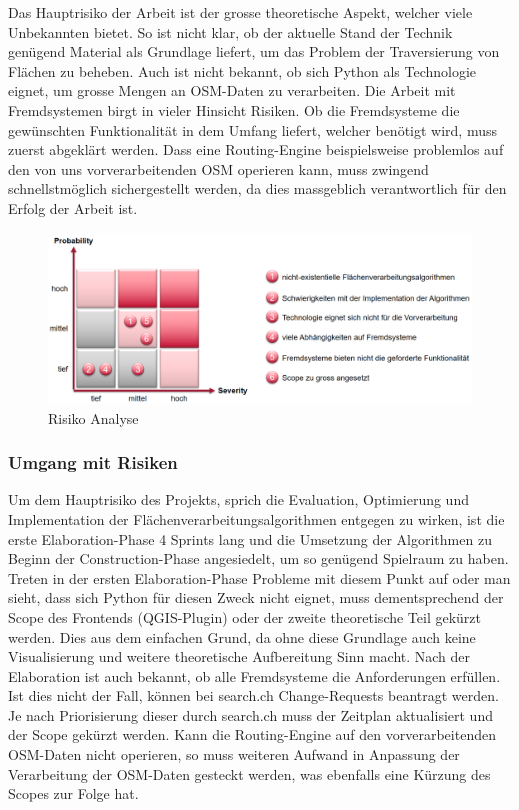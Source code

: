 Das Hauptrisiko der Arbeit ist der grosse theoretische Aspekt, welcher viele Unbekannten bietet. So ist nicht klar, ob der aktuelle Stand der Technik genügend Material als Grundlage liefert, um das Problem der Traversierung von Flächen zu beheben. Auch ist nicht bekannt, ob sich Python als Technologie eignet, um grosse Mengen an \ac{OSM}-Daten zu verarbeiten. Die Arbeit mit Fremdsystemen birgt in vieler Hinsicht Risiken. Ob die Fremdsysteme die gewünschten Funktionalität in dem Umfang liefert, welcher benötigt wird, muss zuerst abgeklärt werden. Dass eine \gls{Routing-Engine} beispielsweise problemlos auf den von uns vorverarbeitenden \ac{OSM} operieren kann, muss zwingend schnellstmöglich sichergestellt werden, da dies massgeblich verantwortlich für den Erfolg der Arbeit ist.

\begin{figure}[ht]
    \centering
    \includegraphics[width=1\linewidth]{projectdoc/img/risk_analysis}
    \caption[Risiko Analyse]{Risiko Analyse}
    \label{fig:risk_analysis}
\end{figure}

\subsubsection{Umgang mit Risiken}
\label{Risiken:Umang mit Risiken}
Um dem Hauptrisiko des Projekts, sprich die Evaluation, Optimierung und Implementation der Flächenverarbeitungsalgorithmen entgegen zu wirken, ist die erste Elaboration-Phase 4 Sprints lang und die Umsetzung der Algorithmen zu Beginn der Construction-Phase angesiedelt, um so genügend Spielraum zu haben. Treten in der ersten Elaboration-Phase Probleme mit diesem Punkt auf oder man sieht, dass sich Python für diesen Zweck nicht eignet, muss dementsprechend der Scope des Frontends (QGIS-Plugin) oder der zweite theoretische Teil gekürzt werden. Dies aus dem einfachen Grund, da ohne diese Grundlage auch keine Visualisierung und weitere theoretische Aufbereitung Sinn macht. Nach der Elaboration ist auch bekannt, ob alle Fremdsysteme die Anforderungen erfüllen. Ist dies nicht der Fall, können bei search.ch \cite{search_ch_route_api} Change-Requests beantragt werden. Je nach Priorisierung dieser durch search.ch muss der Zeitplan aktualisiert und der Scope gekürzt werden. Kann die Routing-Engine auf den vorverarbeitenden \ac{OSM}-Daten nicht operieren, so muss weiteren Aufwand in Anpassung der Verarbeitung der \ac{OSM}-Daten gesteckt werden, was ebenfalls eine Kürzung des Scopes zur Folge hat.

